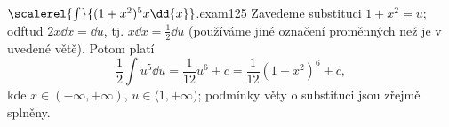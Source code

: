 \begin{mathexam}{\(\scalerel{\int}{(1+x^2)^5x\dd{x}}\)\hfill\cite[s.~261]{Brabec1989}.}{exam125} 
  Zavedeme substituci \(1+x^2 = u\); odftud \(2x\dd{x} = \dd{u}\), tj.
  \(x\dd{x}=\frac{1}{2}\dd{u}\) (používáme jiné označení proměnných než je v uvedené větě). Potom
  platí 
  \begin{equation*}
    \frac{1}{2}\int u^5\dd{u} = \frac{1}{12}u^6 + c = \frac{1}{12}(1+x^2)^6 + c,
  \end{equation*}
  kde \(x\in(-\infty, +\infty)\), \(u\in\langle 1,+\infty)\); podmínky věty o substituci jsou
  zřejmě splněny.  
\end{mathexam}
